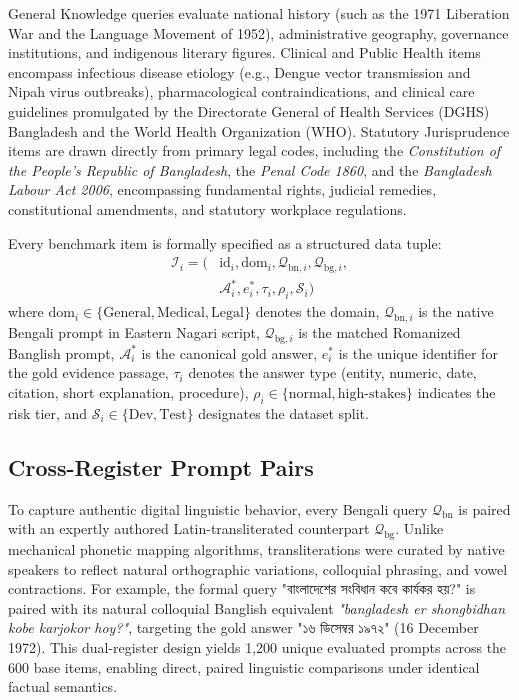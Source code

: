 \documentclass[11pt,a4paper,twocolumn]{article}
\DeclareRobustCommand{\foreignlanguage}[2]{#2}
\let\bengalifont\relax
\DeclareRobustCommand{\foreignlanguage}[2]{{\bengalifont #2}}
\DeclareRobustCommand{\foreignlanguage}[2]{#2}
\begin{document}
General Knowledge queries evaluate national history (such as the 1971 Liberation War and the Language Movement of 1952), administrative geography, governance institutions, and indigenous literary figures. Clinical and Public Health items encompass infectious disease etiology (e.g., Dengue vector transmission and Nipah virus outbreaks), pharmacological contraindications, and clinical care guidelines promulgated by the Directorate General of Health Services (DGHS) Bangladesh and the World Health Organization (WHO). Statutory Jurisprudence items are drawn directly from primary legal codes, including the \emph{Constitution of the People's Republic of Bangladesh}, the \emph{Penal Code 1860}, and the \emph{Bangladesh Labour Act 2006}, encompassing fundamental rights, judicial remedies, constitutional amendments, and statutory workplace regulations.

Every benchmark item is formally specified as a structured data tuple:
\begin{equation}
\begin{split}
    \mathcal{I}_i = \big( &\text{id}_i, \text{dom}_i, \mathcal{Q}_{\text{bn}, i}, \mathcal{Q}_{\text{bg}, i}, \\
    &\mathcal{A}^*_i, e^*_i, \tau_i, \rho_i, \mathcal{S}_i \big)
\end{split}
\label{eq:item_schema}
\end{equation}
where $\text{dom}_i \in \{\text{General}, \text{Medical}, \text{Legal}\}$ denotes the domain, $\mathcal{Q}_{\text{bn}, i}$ is the native Bengali prompt in Eastern Nagari script, $\mathcal{Q}_{\text{bg}, i}$ is the matched Romanized Banglish prompt, $\mathcal{A}^*_i$ is the canonical gold answer, $e^*_i$ is the unique identifier for the gold evidence passage, $\tau_i$ denotes the answer type (entity, numeric, date, citation, short explanation, procedure), $\rho_i \in \{\text{normal}, \text{high-stakes}\}$ indicates the risk tier, and $\mathcal{S}_i \in \{\text{Dev}, \text{Test}\}$ designates the dataset split.

\subsection{Cross-Register Prompt Pairs}
To capture authentic digital linguistic behavior, every Bengali query $\mathcal{Q}_{\text{bn}}$ is paired with an expertly authored Latin-transliterated counterpart $\mathcal{Q}_{\text{bg}}$. Unlike mechanical phonetic mapping algorithms, transliterations were curated by native speakers to reflect natural orthographic variations, colloquial phrasing, and vowel contractions. For example, the formal query \foreignlanguage{bengali}{"বাংলাদেশের সংবিধান কবে কার্যকর হয়?"} is paired with its natural colloquial Banglish equivalent \emph{"bangladesh er shongbidhan kobe karjokor hoy?"}, targeting the gold answer \foreignlanguage{bengali}{"১৬ ডিসেম্বর ১৯৭২"} (16 December 1972). This dual-register design yields 1,200 unique evaluated prompts across the 600 base items, enabling direct, paired linguistic comparisons under identical factual semantics.
\end{document}
